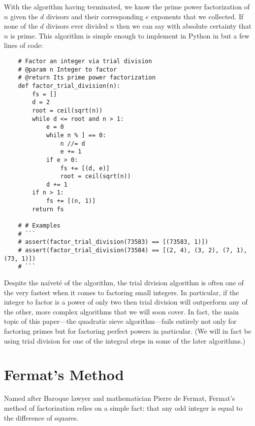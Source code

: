 \documentclass{report}
\begin{document}
With the algorithm having terminated, we know the prime power factorization of $n$ given the $d$
divisors and their corresponding $e$ exponents that we collected. If none of the $d$ divisors ever
divided $n$ then we can say with absolute certainty that $n$ is prime. This algorithm is simple
enough to implement in Python in but a few lines of code:
\begin{verbatim}
    # Factor an integer via trial division
    # @param n Integer to factor
    # @return Its prime power factorization
    def factor_trial_division(n):
        fs = []
        d = 2
        root = ceil(sqrt(n))
        while d <= root and n > 1:
            e = 0
            while n % ] == 0:
                n //= d
                e += 1
            if e > 0:
                fs += [(d, e)]
                root = ceil(sqrt(n))
            d += 1
        if n > 1:
            fs += [(n, 1)]
        return fs

    # # Examples
    # ```
    # assert(factor_trial_division(73583) == [(73583, 1)])
    # assert(factor_trial_division(73584) == [(2, 4), (3, 2), (7, 1), (73, 1)])
    # ```
\end{verbatim}
Despite the naïveté of the algorithm, the trial division algorithm is often one of the very fastest
when it comes to factoring small integers. In particular, if the integer to factor is a power of
only two then trial division will outperform any of the other, more complex algorithms that we will
soon cover. In fact, the main topic of this paper---the quadratic sieve algorithm---fails entirely
not only for factoring primes but for factoring perfect powers in particular. (We will in fact be
using trial division for one of the integral steps in some of the later algorithms.)

\section{Fermat's Method}
Named after Baroque lawyer and mathematician Pierre de Fermat, Fermat's method of factorization
relies on a simple fact: that any odd integer is equal to the difference of squares.
\end{document}
